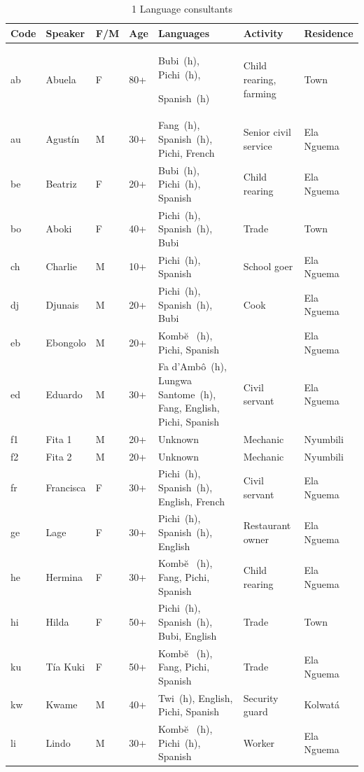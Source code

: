 \begin{longtable}{>{\footnotesize}l@{~}>{\footnotesize}l@{~} >{\footnotesize}l@{~}>{\footnotesize}l >{\footnotesize\raggedright}p{3cm} >{\footnotesize\raggedright}p{2cm} >{\footnotesize}l}
\caption{1 Language consultants}\label{tab:1:1.1}
\\
\lsptoprule

Code & Speaker & F/M & Age & Languages & Activity & Residence\\
\midrule\endhead
ab & Abuela & \textsc{F} & 80+ & Bubi~(h), Pichi~(h), 

Spanish~(h) & Child rearing, farming & Town\\
au & Agustín & M & 30+ & Fang~(h), Spanish~(h), Pichi, French & Senior civil service & Ela Nguema\\
be & Beatriz & \textsc{F} & 20+ & Bubi~(h), Pichi~(h), Spanish & Child rearing & Ela Nguema\\
bo & Aboki & \textsc{F} & 40+ & Pichi~(h), Spanish~(h), Bubi & Trade & Town\\
ch & Charlie & M & 10+ & Pichi~(h), Spanish & School goer & Ela Nguema\\
dj & Djunais & M & 20+ & Pichi~(h), Spanish~(h), Bubi & Cook & Ela Nguema\\
eb & Ebongolo & M & 20+ & Kombe\u{} ~(h), Pichi, Spanish &  & Ela Nguema\\
ed & Eduardo & M & 30+ & Fa d’Ambô~(h), Lungwa Santome~(h), Fang, English, Pichi, Spanish & Civil servant & Ela Nguema\\
f1 & Fita 1 & M & 20+ & Unknown & Mechanic & Nyumbili\\
f2 & Fita 2 & M & 20+ & Unknown & Mechanic & Nyumbili\\
fr & Francisca & \textsc{F} & 30+ & Pichi~(h), Spanish~(h), English, French & Civil servant & Ela Nguema\\
ge & Lage & \textsc{F} & 30+ & Pichi~(h), Spanish~(h), English & Restaurant owner & Ela Nguema\\
he & Hermina & \textsc{F} & 30+ & Kombe\u{} ~(h), Fang, Pichi, Spanish & Child rearing & Ela Nguema\\
hi & Hilda & \textsc{F} & 50+ & Pichi~(h), Spanish~(h), Bubi, English & Trade & Town\\
ku & Tía Kuki & \textsc{F} & 50+ & Kombe\u{} ~(h), Fang, Pichi, Spanish & Trade & Ela Nguema\\
kw & Kwame & M & 40+ & Twi~(h), English, Pichi, Spanish & Security guard & Kolwatá\\
li & Lindo & M & 30+ & Kombe\u{} ~(h), Pichi~(h), Spanish & Worker & Ela Nguema\\

\end{longtable}
